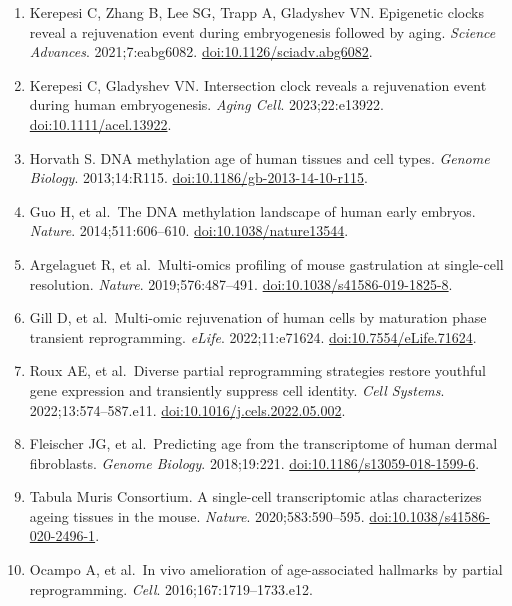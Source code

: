 \documentclass[
  11pt,
  letterpaper,
]{article}
\begin{document}
\begin{enumerate}
\def\labelenumi{\arabic{enumi}.}
\item
  Kerepesi C, Zhang B, Lee SG, Trapp A, Gladyshev VN. Epigenetic clocks
  reveal a rejuvenation event during embryogenesis followed by aging.
  \emph{Science Advances}. 2021;7:eabg6082.
  \href{https://doi.org/10.1126/sciadv.abg6082}{doi:10.1126/sciadv.abg6082}.
\item
  Kerepesi C, Gladyshev VN. Intersection clock reveals a rejuvenation
  event during human embryogenesis. \emph{Aging Cell}. 2023;22:e13922.
  \href{https://doi.org/10.1111/acel.13922}{doi:10.1111/acel.13922}.
\item
  Horvath S. DNA methylation age of human tissues and cell types.
  \emph{Genome Biology}. 2013;14:R115.
  \href{https://doi.org/10.1186/gb-2013-14-10-r115}{doi:10.1186/gb-2013-14-10-r115}.
\item
  Guo H, et al.~The DNA methylation landscape of human early embryos.
  \emph{Nature}. 2014;511:606--610.
  \href{https://doi.org/10.1038/nature13544}{doi:10.1038/nature13544}.
\item
  Argelaguet R, et al.~Multi-omics profiling of mouse gastrulation at
  single-cell resolution. \emph{Nature}. 2019;576:487--491.
  \href{https://doi.org/10.1038/s41586-019-1825-8}{doi:10.1038/s41586-019-1825-8}.
\item
  Gill D, et al.~Multi-omic rejuvenation of human cells by maturation
  phase transient reprogramming. \emph{eLife}. 2022;11:e71624.
  \href{https://doi.org/10.7554/eLife.71624}{doi:10.7554/eLife.71624}.
\item
  Roux AE, et al.~Diverse partial reprogramming strategies restore
  youthful gene expression and transiently suppress cell identity.
  \emph{Cell Systems}. 2022;13:574--587.e11.
  \href{https://doi.org/10.1016/j.cels.2022.05.002}{doi:10.1016/j.cels.2022.05.002}.
\item
  Fleischer JG, et al.~Predicting age from the transcriptome of human
  dermal fibroblasts. \emph{Genome Biology}. 2018;19:221.
  \href{https://doi.org/10.1186/s13059-018-1599-6}{doi:10.1186/s13059-018-1599-6}.
\item
  Tabula Muris Consortium. A single-cell transcriptomic atlas
  characterizes ageing tissues in the mouse. \emph{Nature}.
  2020;583:590--595.
  \href{https://doi.org/10.1038/s41586-020-2496-1}{doi:10.1038/s41586-020-2496-1}.
\item
  Ocampo A, et al.~In vivo amelioration of age-associated hallmarks by
  partial reprogramming. \emph{Cell}. 2016;167:1719--1733.e12.

\end{enumerate}
\end{document}
